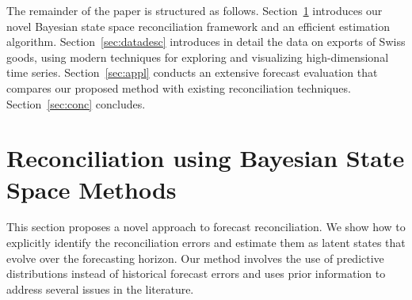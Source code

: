 \documentclass[a4paper,fleqn,11pt]{article}
\begin{document}
The remainder of the paper is structured as follows. Section~\ref{sec:model} introduces our novel Bayesian state space reconciliation framework and an efficient estimation algorithm.  Section~\ref{sec:datadesc} introduces in detail the data on exports of Swiss goods, using modern techniques for exploring and visualizing high-dimensional time series.  Section~\ref{sec:appl} conducts an extensive forecast evaluation that compares our proposed method with existing reconciliation techniques. Section~\ref{sec:conc} concludes.






\section{Reconciliation using Bayesian State Space Methods}\label{sec:model}

This section proposes a novel approach to forecast reconciliation. We show how to explicitly identify the reconciliation errors and estimate them as latent states that evolve over the forecasting horizon. Our method involves the use of predictive distributions instead of historical forecast errors and uses prior information to address several issues in the literature. 
\end{document}
